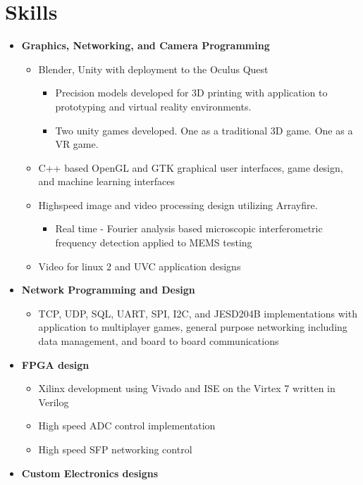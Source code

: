 \documentclass[10pt]{extarticle}
\theoremstyle{plain}
\theoremstyle{Definition}
\theoremstyle{Definition}
\theoremstyle{plain}
\begin{document}
	\section{Skills}
		\begin{itemize}
			\item \textbf{Graphics, Networking, and Camera Programming}
			\begin{itemize} 
				\item Blender, Unity with deployment to the Oculus Quest
				\begin{itemize}
					\item Precision models developed for 3D printing with application to prototyping and virtual reality environments. 
					\item Two unity games developed. One as a traditional 3D game. One as a VR game. 
				\end{itemize}
				\item C++ based OpenGL and GTK graphical user interfaces, game design, and machine learning interfaces
				\item Highspeed image and video processing design utilizing Arrayfire. 
				\begin{itemize}
					\item Real time - Fourier analysis based microscopic interferometric frequency detection applied to MEMS testing
				\end{itemize}					
				\item Video for linux 2 and UVC application designs
			\end{itemize}
			\item \textbf{Network Programming and Design}
			\begin{itemize}
				\item TCP, UDP, SQL, UART, SPI, I2C, and 
				JESD204B implementations with application to multiplayer games, general purpose networking including data management, and board to board communications
			\end{itemize}
			\item \textbf{FPGA design}
			\begin{itemize}
				\item Xilinx development using Vivado and ISE on the Virtex 7 written in Verilog
				\item High speed ADC control implementation
				\item High speed SFP networking control
			\end{itemize}
			\item \textbf{Custom Electronics designs}

\end{itemize}
\end{document}
